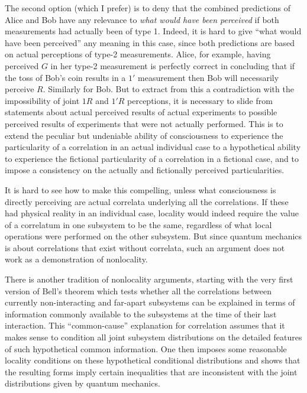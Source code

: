 The second option (which I prefer) is to deny that the combined
predictions of Alice and Bob have any relevance to {\it what would have
been perceived\/} if both measurements had actually been of type 1.
Indeed, it is hard to give ``what would have been perceived'' any
meaning in this case, since both predictions are based on actual
perceptions of type-2 measurements.  Alice, for example, having
perceived $G$ in her type-2 measurement is perfectly correct in
concluding that if the toss of Bob's coin results in a $1'$
measurement then Bob will necessarily perceive $R$.  Similarly for
Bob.  But to extract from this a contradiction with the impossibility
of joint $1R$ and $1'R$ perceptions, it is necessary to slide from
statements about actual perceived results of actual experiments to
possible perceived results of experiments that were not actually
performed.  This is to extend the peculiar but undeniable ability of
consciousness to experience the particularity of a correlation in an
actual individual case to a hypothetical ability to experience the
fictional particularity of a correlation in a fictional case, and to
impose a consistency on the actually and fictionally perceived
particularities.  

It is hard to see how to make this compelling, unless what
consciousness is directly perceiving are actual correlata underlying
all the correlations.  If these had physical reality in an individual
case, locality would indeed require the value of a correlatum in one
subsystem to be the same, regardless of what local operations were
performed on the other subsystem.  But since quantum mechanics is
about correlations that exist without correlata, such an argument does
not work as a demonstration of nonlocality.\fn

\bigskip

There is another tradition of nonlocality arguments, starting with the
very first version of Bell's theorem which tests whether all the
correlations between currently non-interacting and far-apart
subsystems can be explained in terms of information commonly available
to the subsystems at the time of their last interaction.  This
``common-cause'' explanation for correlation assumes that it makes
sense to condition all joint subsystem distributions on the detailed
features of such hypothetical common information.  One then imposes
some reasonable locality conditions on these hypothetical conditional
distributions and shows that the resulting forms imply certain
inequalities that are inconsistent with the joint distributions given
by quantum mechanics.

